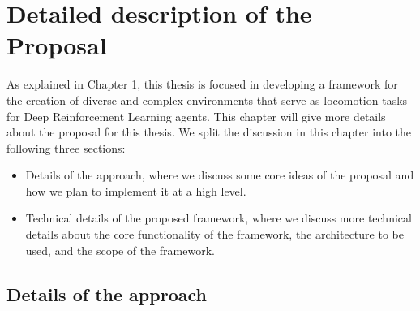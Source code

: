 
\chapter{Detailed description of the Proposal}
\label{ch:proposal}



As explained in Chapter 1, this thesis is focused  in developing a framework for 
the creation of diverse and complex environments that serve as locomotion tasks 
for Deep Reinforcement Learning agents. This chapter will give more details about the 
proposal for this thesis. We split the discussion in this chapter into the following 
three sections: 

\begin{itemize}
    \item Details of the approach, where we discuss some core ideas of the proposal and
          how we plan to implement it at a high level.
    \item Technical details of the proposed framework, where we discuss more technical details about
          the core functionality of the framework, the architecture to be used, 
          and the scope of the framework.
\end{itemize}

\section{Details of the approach}


